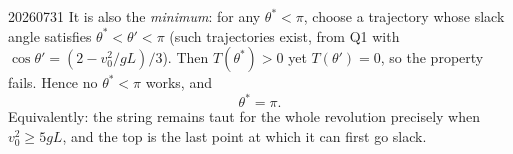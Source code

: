 \begin{solution}{20260731}
It is also the \emph{minimum}: for any $\theta^{*} < \pi$, choose a trajectory whose slack angle satisfies $\theta^{*} < \theta' < \pi$ (such trajectories exist, from Q1 with $\cos\theta' = (2 - v_{0}^{2}/gL)/3$).  Then $T(\theta^{*}) > 0$ yet $T(\theta') = 0$, so the property fails.  Hence no $\theta^{*} < \pi$ works, and
\[
  \boxed{\theta^{*} = \pi}.
\]
Equivalently: the string remains taut for the whole revolution precisely when $v_{0}^{2} \ge 5gL$, and the top is the last point at which it can first go slack.

\end{solution}


